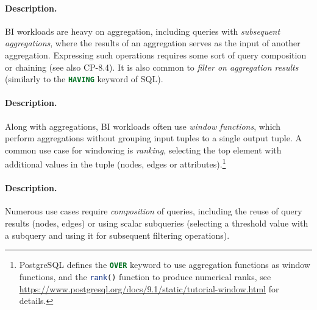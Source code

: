 



\paragraph{Description.}

BI workloads are heavy on aggregation, including queries with \emph{subsequent
aggregations}, where the results of an aggregation serves as the input of
another aggregation. Expressing such operations requires some sort of query
composition or chaining (see also CP-8.4). It is also common to \emph{filter on
aggregation results} (similarly to the \lstinline[language=sql]{HAVING} keyword of SQL).





\paragraph{Description.}

Along with aggregations, BI workloads often use \emph{window functions},
which perform aggregations without grouping input tuples to a single output
tuple.  A common use case for windowing is \emph{ranking}, \ie selecting the top
element with additional values in the tuple (nodes, edges or
attributes).\footnote{PostgreSQL defines the \lstinline[language=sql]{OVER}
keyword to use aggregation functions as window functions, and the
\lstinline[language=sql]{rank()} function to produce numerical ranks, see
\url{https://www.postgresql.org/docs/9.1/static/tutorial-window.html} for
details.}





\paragraph{Description.}

Numerous use cases require \emph{composition} of queries, including the reuse of
query results (\eg nodes, edges) or using scalar subqueries (\eg selecting a
threshold value with a subquery and using it for subsequent filtering
operations).

